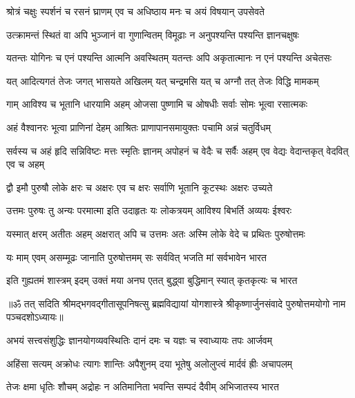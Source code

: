 \twolineshloka
{श्रोत्रं चक्षुः स्पर्शनं च रसनं घ्राणम् एव च}
{अधिष्ठाय मनः च अयं विषयान् उपसेवते}%

\twolineshloka
{उत्क्रामन्तं स्थितं वा अपि भुञ्जानं वा गुणान्वितम्}
{विमूढाः न अनुपश्यन्ति पश्यन्ति ज्ञानचक्षुषः}%

\twolineshloka
{यतन्तः योगिनः च एनं पश्यन्ति आत्मनि अवस्थितम्}
{यतन्तः अपि अकृतात्मानः न एनं पश्यन्ति अचेतसः}%

\twolineshloka
{यत् आदित्यगतं तेजः जगत् भासयते अखिलम्}
{यत् चन्द्रमसि यत् च अग्नौ तत् तेजः विद्धि मामकम्}%

\twolineshloka
{गाम् आविश्य च भूतानि धारयामि अहम् ओजसा}
{पुष्णामि च ओषधीः सर्वाः सोमः भूत्वा रसात्मकः}%

\twolineshloka
{अहं वैश्वानरः भूत्वा प्राणिनां देहम् आश्रितः}
{प्राणापानसमायुक्तः पचामि अन्नं चतुर्विधम्}%

\fourlineindentedshloka
{सर्वस्य च अहं हृदि सन्निविष्टः}
{मत्तः स्मृतिः ज्ञानम् अपोहनं च}
{वेदैः च सर्वैः अहम् एव वेद्यः}
{वेदान्तकृत् वेदवित् एव च अहम्}%

\twolineshloka
{द्वौ इमौ पुरुषौ लोके क्षरः च अक्षरः एव च}
{क्षरः सर्वाणि भूतानि कूटस्थः अक्षरः उच्यते}%

\twolineshloka
{उत्तमः पुरुषः तु अन्यः परमात्मा इति उदाहृतः}
{यः लोकत्रयम् आविश्य बिभर्ति अव्ययः ईश्वरः}%

\twolineshloka
{यस्मात् क्षरम् अतीतः अहम् अक्षरात् अपि च उत्तमः}
{अतः अस्मि लोके वेदे च प्रथितः पुरुषोत्तमः}%

\twolineshloka
{यः माम् एवम् असम्मूढः जानाति पुरुषोत्तमम्}
{सः सर्ववित् भजति मां सर्वभावेन भारत}%

\twolineshloka
{इति गुह्यतमं शास्त्रम् इदम् उक्तं मया अनघ}
{एतत् बुद्ध्वा बुद्धिमान् स्यात् कृतकृत्यः च भारत}%

{॥ॐ तत् सदिति श्रीमद्भगवद्गीतासूपनिषत्सु ब्रह्मविद्यायां योगशास्त्रे श्रीकृष्णार्जुनसंवादे पुरुषोत्तमयोगो नाम पञ्चदशोऽध्यायः॥}



\twolineshloka
{अभयं सत्त्वसंशुद्धिः ज्ञानयोगव्यवस्थितिः}
{दानं दमः च यज्ञः च स्वाध्यायः तपः आर्जवम्}%

\twolineshloka
{अहिंसा सत्यम् अक्रोधः त्यागः शान्तिः अपैशुनम्}
{दया भूतेषु अलोलुप्त्वं मार्दवं ह्रीः अचापलम्}%

\twolineshloka
{तेजः क्षमा धृतिः शौचम् अद्रोहः न अतिमानिता}
{भवन्ति सम्पदं दैवीम् अभिजातस्य भारत}%

